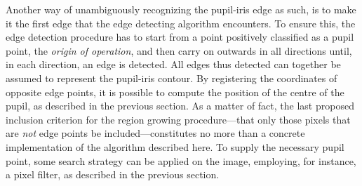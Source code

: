 Another way of unambiguously recognizing the pupil-iris edge as such,
is to make it the first edge that the edge detecting algorithm
encounters.  To ensure this, the edge detection procedure has to start
from a point positively classified as a pupil point, the {\em origin
  of operation\/}, and then carry on outwards in all directions until,
in each direction, an edge is detected.  All edges thus detected can
together be assumed to represent the pupil-iris contour.  By
registering the coordinates of opposite edge points, it is possible to
compute the position of the centre of the pupil, as described in the
previous section.  As a matter of fact, the last proposed inclusion
criterion for the region growing procedure---that only those pixels
that are {\em not\/} edge points be included---constitutes no more
than a concrete implementation of the algorithm described here.  To
supply the necessary pupil point, some search strategy can be applied
on the image, employing, for instance, a pixel filter, as described in
the previous section.

